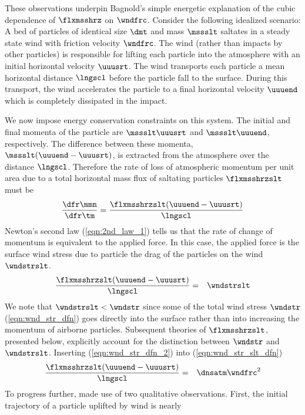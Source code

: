 \documentclass[12pt,twoside]{book}
\begin{document}
These observations underpin Bagnold's simple energetic explanation of
the cubic dependence of $\flxmsshrz$ on $\wndfrc$.
Consider the following idealized scenario:
A bed of particles of identical size $\dmt$ and mass $\mssslt$ saltates
in a steady state wind with friction velocity $\wndfrc$. 
The wind (rather than impacts by other particles) is responsible for
lifting each particle into the atmosphere with an initial horizontal
velocity $\uuusrt$. 
The wind transports each particle a mean horizontal distance $\lngscl$  
before the particle fall to the surface.
During this transport, the wind accelerates the particle to a final
horizontal velocity $\uuuend$ which is completely dissipated in the
impact.  

We now impose energy conservation constraints on this system.
The initial and final momenta of the particle are 
$\mssslt \uuusrt$ and $\mssslt \uuuend$, respectively.
The difference between these momenta, $\mssslt (\uuuend - \uuusrt)$, is
extracted from the atmosphere over the distance $\lngscl$.
Therefore the rate of loss of atmospheric momentum per unit area due
to a total horizontal mass flux of saltating particles
$\flxmsshrzslt$ must be 
\begin{equation}
\frac{\dfr\mmn}{\dfr\tm} = \frac{\flxmsshrzslt (\uuuend - \uuusrt)}{\lngscl }
\label{eqn:mmn_roc}
\end{equation}
Newton's second law (\ref{eqn:2nd_law_1}) tells us that the rate of
change of momentum is equivalent to the applied force.
In this case, the applied force is the surface wind stress due to
particle the drag of the particles on the wind $\wndstrslt$. 
\begin{eqnarray}
\frac{\flxmsshrzslt (\uuuend - \uuusrt)}{\lngscl } & = & \wndstrslt
\label{eqn:wnd_str_slt_dfn}
\end{eqnarray}
We note that $\wndstrslt < \wndstr$ since some of the total wind
stress $\wndstr$ (\ref{eqn:wnd_str_dfn}) goes directly into the
surface rather than into increasing the momentum of airborne
particles. 
Subsequent theories of $\flxmsshrzslt$, presented below, explicitly account 
for the distinction between $\wndstr$ and $\wndstrslt$.
Inserting (\ref{eqn:wnd_str_dfn_2}) into (\ref{eqn:wnd_str_slt_dfn}) 
\begin{eqnarray}
\frac{\flxmsshrzslt (\uuuend - \uuusrt)}{\lngscl } & = & \dnsatm \wndfrc^{2}
\label{eqn:mmn_wnd_frc}
\end{eqnarray}
To progress further, \cite{Bag41} made use of two qualitative
observations. 
First, the initial trajectory of a particle uplifted by wind is nearly
\end{document}
